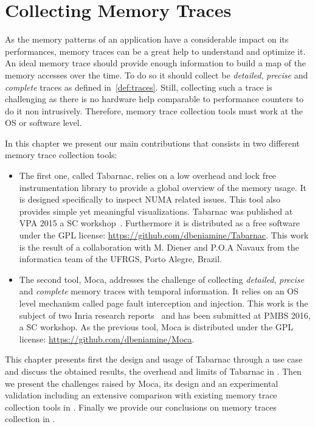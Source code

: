 \chapter{Collecting Memory Traces}

As the memory patterns of an application have a considerable impact on its performances, memory traces can be a great help to understand and optimize  it.
An ideal memory trace should provide enough information to build a map of the memory accesses over the time.
To do so it should collect be \emph{detailed}, \emph{precise} and \emph{complete} traces as defined in~\ref{def:traces}.
Still, collecting such a trace is challenging as there is no hardware help comparable to performance counters to do it non intrusively.
Therefore, memory trace collection tools must work at the \gls{OS} or software level.

In this chapter we present our main contributions that consists in two different memory trace collection tools:
\begin{itemize}
    \item The first one, called \gls{Tabarnac}, relies on a low overhead and lock free instrumentation library to provide a global overview of the memory usage.
        It is designed specifically to inspect \gls{NUMA} related issues.
        This tool also provides simple yet meaningful visualizations.
        \gls{Tabarnac} was published at \gls{VPA} 2015 a \gls{SC} workshop~\cite{Beniamine15TABARNAC}.
        Furthermore it is distributed as a free software under the \gls{GPL} license: \url{https://github.com/dbeniamine/Tabarnac}.
        This work is the result of a collaboration with M. Diener and P.O.A Navaux from the informatica team of the \gls{UFRGS}, Porto Alegre, Brazil.
    \item The second tool, \gls{Moca}, addresses the challenge of collecting \emph{detailed}, \emph{precise} and \emph{complete} memory traces with temporal information.
        It relies on an \gls{OS} level mechanism called page fault interception and injection.
        This work is the subject of two Inria research reports~\cite{Beniamine15Memory,Beniamine16Moca} and has been submitted at \gls{PMBS} 2016, a \gls{SC} workshop.
        As the previous tool, \gls{Moca} is distributed under the \gls{GPL} license: \url{https://github.com/dbeniamine/Moca}.
\end{itemize}

This chapter presents first the design and usage of \gls{Tabarnac} through a use case and discuss the obtained results, the overhead and limits of \gls{Tabarnac} in .
Then we present the challenges raised by \gls{Moca}, its design and an experimental validation including an extensive comparison with existing memory trace collection tools in .
Finally we provide our conclusions on memory traces collection in .


